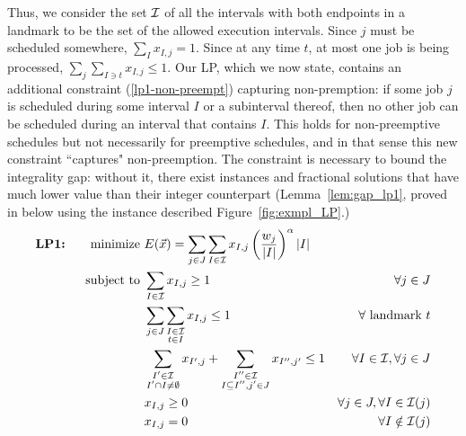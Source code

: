 Thus, we consider the set  ${\cal I}$ of all the  intervals with both endpoints in a landmark to be   the set of the allowed execution intervals.
Since $j$ must be scheduled somewhere, $\sum_{I} x_{I,j} = 1$. Since at any time $t$, at most one job is being processed, 
$\sum_j \sum_{I\ni t} x_{I,j}\leq 1$. Our LP, which we now state, contains an additional constraint (\ref{lp1-non-preempt}) capturing non-premption:
if some job $j$ is scheduled  during some interval $I$ or a subinterval thereof, then no other job can be scheduled during an interval that contains $I$. This holds for non-preemptive schedules but not necessarily for preemptive schedules, and in that sense this new constraint ``captures" non-preemption. The constraint is necessary to bound the integrality gap: without it, there exist instances and  fractional solutions that have much lower value than their integer counterpart (Lemma~\ref{lem:gap_lp1}, proved in below using  the instance described Figure~\ref{fig:exmpl_LP}.)   
\begin{alignat}{2}
    \textbf{\text{LP1:}} \quad \quad \text{minimize }   &E(\vec{x}) = \sum_{j \in J} \sum_{I \in \mathcal{I}} x_{I,j} \left(\frac{w_j}{|I|}\right)^{\alpha}  |I| &\\
    \text{subject to } & \sum_{I \in \mathcal{I}} x_{I,j} \ge 1 & \forall j \in J \label{lp1-job-assigned}\\
                       & \sum_{j \in J} \sum_{\substack{I \in \mathcal{I}\\ t \in I}} x_{I,j} \le 1 & \forall \text{ landmark } t \label{lp1-no-overlap}\\
                       & \sum_{\substack{I' \in \mathcal{I}\\ I' \cap I \neq \emptyset}} x_{I',j}  + \sum_{\substack{I'' \in \mathcal{I}\\ I \subseteq I'', j' \in J}} x_{I'',j'} \le 1& \forall I \in \mathcal{I}, \forall j \in J \label{lp1-non-preempt}\\
                       & x_{I,j} \ge 0 & \forall j \in J, \forall I \in \mathcal{I}(j) \label{lp1-non-negativity}\\
                       & x_{I,j} = 0 & \forall I \notin \mathcal{I}(j)
\end{alignat}



